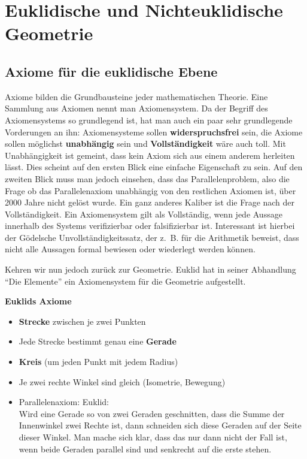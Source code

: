 \chapter{Euklidische und Nichteuklidische Geometrie}
\section{Axiome für die euklidische Ebene}
Axiome bilden die Grundbausteine jeder mathematischen Theorie. Eine
Sammlung aus Axiomen nennt man Axiomensystem.
Da der Begriff des Axiomensystems so grundlegend ist, hat man auch 
ein paar sehr grundlegende Vorderungen an ihn: Axiomensysteme sollen
\textbf{widerspruchsfrei} sein, die Axiome sollen möglichst
\textbf{unabhängig} sein und \textbf{Vollständigkeit} wäre auch toll.
Mit Unabhängigkeit ist gemeint, dass kein Axiom sich aus einem anderem
herleiten lässt. Dies scheint auf den ersten Blick eine einfache
Eigenschaft zu sein. Auf den zweiten Blick muss man jedoch einsehen, 
dass das Parallelenproblem, also die Frage ob das Parallelenaxiom 
unabhängig von den restlichen Axiomen ist, über 2000 Jahre nicht 
gelöst wurde. Ein ganz anderes Kaliber ist die Frage nach der
Vollständigkeit. Ein Axiomensystem gilt als Vollständig, wenn
jede Aussage innerhalb des Systems verifizierbar oder falsifizierbar
ist. Interessant ist hierbei der Gödelsche Unvollständigkeitssatz, 
der z.~B. für die Arithmetik beweist, dass nicht alle Aussagen
formal bewiesen oder wiederlegt werden können.

Kehren wir nun jedoch zurück zur Geometrie. Euklid hat in seiner 
Abhandlung \enquote{Die Elemente} ein Axiomensystem für die Geometrie
aufgestellt. 

\textbf{Euklids Axiome}
\begin{itemize}
    \item \textbf{Strecke} zwischen je zwei Punkten
    \item Jede Strecke bestimmt genau eine \textbf{Gerade}
    \item \textbf{Kreis} (um jeden Punkt mit jedem Radius)
    \item Je zwei rechte Winkel sind gleich (Isometrie, Bewegung)
    \item Parallelenaxiom: Euklid:\\
        Wird eine Gerade so von zwei Geraden geschnitten, dass die 
        Summe der Innenwinkel zwei Rechte ist, dann schneiden sich
        diese Geraden auf der Seite dieser Winkel.
        Man mache sich klar, dass das nur dann nicht der Fall ist, 
        wenn beide Geraden parallel sind und senkrecht auf die erste stehen.
\end{itemize}


